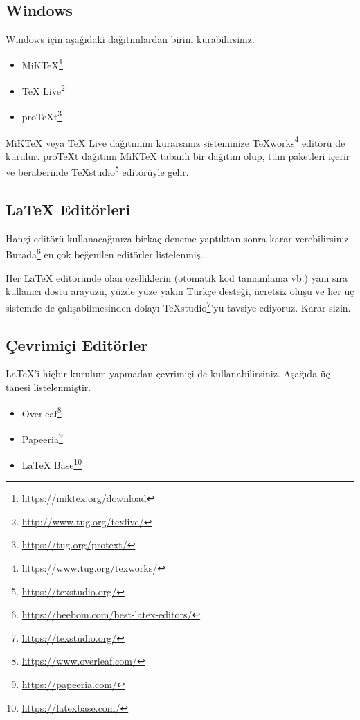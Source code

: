 \documentclass[
  10pt,
]{scrbook}
\providecommand{\tightlist}{%
  \setlength{\itemsep}{0pt}\setlength{\parskip}{0pt}}
\renewcommand{\href}[2]{#2\footnote{\url{#1}}}
\theoremstyle{definition}
\theoremstyle{definition}
\theoremstyle{definition}
\theoremstyle{definition}
\theoremstyle{remark}
\begin{document}
\hypertarget{windows}{%
\subsection{Windows}\label{windows}}

Windows için aşağıdaki dağıtımlardan birini kurabilirsiniz.

\begin{itemize}
\tightlist
\item
  \href{https://miktex.org/download}{MiKTeX}
\item
  \href{http://www.tug.org/texlive/}{TeX Live}
\item
  \href{https://tug.org/protext/}{proTeXt}
\end{itemize}

MiKTeX veya TeX Live dağıtımını kurarsanız sisteminize \href{https://www.tug.org/texworks/}{TeXworks} editörü de kurulur. proTeXt dağıtımı MiKTeX tabanlı bir dağıtım olup, tüm paketleri içerir ve beraberinde \href{https://texstudio.org/}{TeXstudio} editörüyle gelir.

\hypertarget{latex-edituxf6rleri}{%
\subsection{LaTeX Editörleri}\label{latex-edituxf6rleri}}

Hangi editörü kullanacağınıza birkaç deneme yaptıktan sonra karar verebilirsiniz. \href{https://beebom.com/best-latex-editors/}{Burada} en çok beğenilen editörler listelenmiş.

Her LaTeX editöründe olan özelliklerin (otomatik kod tamamlama vb.) yanı sıra kullanıcı dostu arayüzü, yüzde yüze yakın Türkçe desteği, ücretsiz oluşu ve her üç sistemde de çalışabilmesinden dolayı \href{https://texstudio.org/}{TeXstudio}'yu tavsiye ediyoruz. Karar sizin.

\hypertarget{uxe7evrimiuxe7i-edituxf6rler}{%
\subsection{Çevrimiçi Editörler}\label{uxe7evrimiuxe7i-edituxf6rler}}

LaTeX'i hiçbir kurulum yapmadan çevrimiçi de kullanabilirsiniz. Aşağıda üç tanesi listelenmiştir.

\begin{itemize}
\tightlist
\item
  \href{https://www.overleaf.com/}{Overleaf}
\item
  \href{https://papeeria.com/}{Papeeria}
\item
  \href{https://latexbase.com/}{LaTeX Base}
\end{itemize}
\end{document}
